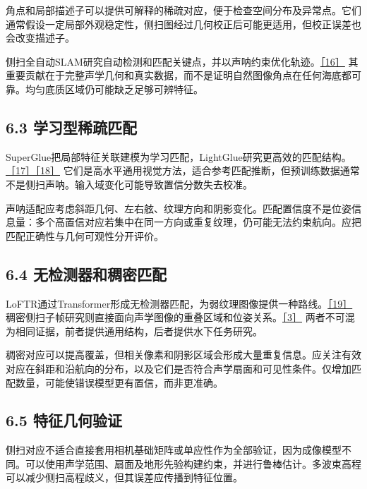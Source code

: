 角点和局部描述子可以提供可解释的稀疏对应，便于检查空间分布及异常点。它们通常假设一定局部外观稳定性，侧扫图经过几何校正后可能更适用，但校正误差也会改变描述子。

侧扫全自动SLAM研究自动检测和匹配关键点，并以声呐约束优化轨迹。\href{https://arxiv.org/abs/2304.01854}{［16］} 其重要贡献在于完整声学几何和真实数据，而不是证明自然图像角点在任何海底都可靠。均匀底质区域仍可能缺乏足够可辨特征。

\hypertarget{ux5b66ux4e60ux578bux7a00ux758fux5339ux914d}{%
\subsection{6.3 学习型稀疏匹配}\label{ux5b66ux4e60ux578bux7a00ux758fux5339ux914d}}

SuperGlue把局部特征关联建模为学习匹配，LightGlue研究更高效的匹配结构。\href{https://arxiv.org/abs/1911.11763}{［17］}\href{https://arxiv.org/abs/2306.13643}{［18］} 它们是高水平通用视觉方法，适合参考匹配推断，但预训练数据通常不是侧扫声呐。输入域变化可能导致置信分数失去校准。

声呐适配应考虑斜距几何、左右舷、纹理方向和阴影变化。匹配置信度不是位姿信息量：多个高置信对应若集中在同一方向或重复纹理，仍可能无法约束航向。应把匹配正确性与几何可观性分开评价。

\hypertarget{ux65e0ux68c0ux6d4bux5668ux548cux7a20ux5bc6ux5339ux914d}{%
\subsection{6.4 无检测器和稠密匹配}\label{ux65e0ux68c0ux6d4bux5668ux548cux7a20ux5bc6ux5339ux914d}}

LoFTR通过Transformer形成无检测器匹配，为弱纹理图像提供一种路线。\href{https://arxiv.org/abs/2104.00680}{［19］} 稠密侧扫子帧研究则直接面向声学图像的重叠区域和位姿关系。\href{https://arxiv.org/abs/2312.13802}{［3］} 两者不可混为相同证据，前者提供通用结构，后者提供水下任务研究。

稠密对应可以提高覆盖，但相关像素和阴影区域会形成大量重复信息。应关注有效对应在斜距和沿航向的分布，以及它们是否符合声学扇面和可见性条件。仅增加匹配数量，可能使错误模型更有置信，而非更准确。

\hypertarget{ux7279ux5f81ux51e0ux4f55ux9a8cux8bc1}{%
\subsection{6.5 特征几何验证}\label{ux7279ux5f81ux51e0ux4f55ux9a8cux8bc1}}

侧扫对应不适合直接套用相机基础矩阵或单应性作为全部验证，因为成像模型不同。可以使用声学范围、扇面及地形先验构建约束，并进行鲁棒估计。多波束高程可以减少侧扫高程歧义，但其误差应传播到特征位置。

